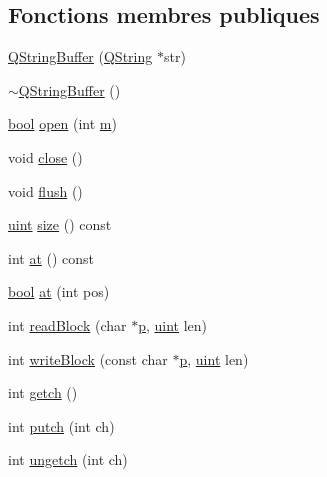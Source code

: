 \subsection*{Fonctions membres publiques}
\begin{DoxyCompactItemize}
\item 
\hyperlink{class_q_string_buffer_ab5fe1a964b28565381b6c180e69a9056}{Q\+String\+Buffer} (\hyperlink{class_q_string}{Q\+String} $\ast$str)
\item 
\hyperlink{class_q_string_buffer_a4bd0997b2ba1ac9b40802260e570b521}{$\sim$\+Q\+String\+Buffer} ()
\item 
\hyperlink{qglobal_8h_a1062901a7428fdd9c7f180f5e01ea056}{bool} \hyperlink{class_q_string_buffer_a593d2870764f6888dd1aabea55304a46}{open} (int \hyperlink{060__command__switch_8tcl_a78d127e8bda64d4471ac811ad512fbd9}{m})
\item 
void \hyperlink{class_q_string_buffer_aabc8736ce1f90cd66212c5a6b2e166ea}{close} ()
\item 
void \hyperlink{class_q_string_buffer_a2961ddd6de68bb9e681ae8e18b6b298b}{flush} ()
\item 
\hyperlink{qglobal_8h_a4d3943ddea65db7163a58e6c7e8df95a}{uint} \hyperlink{class_q_string_buffer_a3879e3602960ecedd4943b65f520cf9d}{size} () const 
\item 
int \hyperlink{class_q_string_buffer_a432df0ebe98f845130d64a2097a97674}{at} () const 
\item 
\hyperlink{qglobal_8h_a1062901a7428fdd9c7f180f5e01ea056}{bool} \hyperlink{class_q_string_buffer_a36caaffb3e157196ce5201f0f7c9fa25}{at} (int pos)
\item 
int \hyperlink{class_q_string_buffer_a6cda82dda018af5291df80676eb037a4}{read\+Block} (char $\ast$\hyperlink{060__command__switch_8tcl_a15229b450f26d8fa1c10bea4f3279f4d}{p}, \hyperlink{qglobal_8h_a4d3943ddea65db7163a58e6c7e8df95a}{uint} len)
\item 
int \hyperlink{class_q_string_buffer_a4c17bf2b2702b837ba614bd92ad0d7a2}{write\+Block} (const char $\ast$\hyperlink{060__command__switch_8tcl_a15229b450f26d8fa1c10bea4f3279f4d}{p}, \hyperlink{qglobal_8h_a4d3943ddea65db7163a58e6c7e8df95a}{uint} len)
\item 
int \hyperlink{class_q_string_buffer_acebe86e5beeaff3863673fc56089e2da}{getch} ()
\item 
int \hyperlink{class_q_string_buffer_ac95cff6e837ae523527b9d78cb6a4074}{putch} (int ch)
\item 
int \hyperlink{class_q_string_buffer_ad6e53fb9f2f2969b9f9a7a1daa2d7af2}{ungetch} (int ch)
\end{DoxyCompactItemize}
